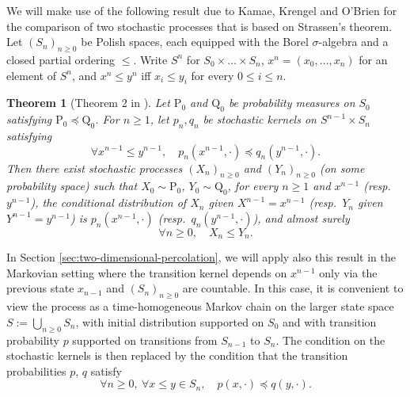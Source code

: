 \documentclass[11pt]{article}
\newtheorem{theorem}{Theorem}
\theoremstyle{remark}
\begin{document}
We will make use of the following result due to Kamae, Krengel and O’Brien
for the comparison of two stochastic processes that is based on Strassen’s theorem. Let $(S_n)_{n\ge 0}$ be Polish spaces, each equipped with the Borel $\sigma$-algebra and a closed partial ordering $\leq$. Write $S^n$ for $S_0 \times \ldots \times S_n$, $x^n = (x_0,\ldots,x_n)$ for an element of $S^n$, and $x^n \le y^n$ iff $x_i \le y_i$ for every $0\le i\le n$.
\begin{theorem}[Theorem 2 in \cite{Kamae1977}] \label{thm:Kamae}
	Let $\mathrm{P}_0$ and $\mathrm{Q}_0$ be probability measures on $S_0$ satisfying $\mathrm{P}_0 \preceq \mathrm{Q}_0$. For $n\ge 1$, let $p_n,q_n$ be stochastic kernels on $S^{n-1}\times S_n$ satisfying
	\begin{equation}
		\forall x^{n-1} \le y^{n-1}, \quad p_n(x^{n-1},\boldsymbol{\cdot}) \preceq q_n(y^{n-1},\boldsymbol{\cdot}).
	\end{equation}
	Then there exist stochastic processes $(X_n)_{n\ge 0}$ and $(Y_n)_{n\ge 0}$ (on some probability space) such that $X_0 \sim \mathrm{P}_0$, $Y_0 \sim \mathrm{Q}_0$, for every $n\ge 1$ and $x^{n-1}$ (resp.\ $y^{n-1}$), the conditional distribution of $X_n$ given $X^{n-1} = x^{n-1}$ (resp.\ $Y_n$ given $Y^{n-1} = y^{n-1}$) is $p_n(x^{n-1},\boldsymbol{\cdot})$ (resp.\ $q_n(y^{n-1},\boldsymbol{\cdot})$), and almost surely
	\begin{equation}
		\forall n \ge 0, \quad X_n \le Y_n.
	\end{equation}
\end{theorem}
In Section \ref{sec:two-dimensional-percolation}, we will apply also this result in the Markovian setting where the transition kernel depends on $x^{n-1}$ only via the previous state $x_{n-1}$ and $(S_n)_{n\ge 0}$ are countable. In this case, it is convenient to view the process as a time-homogeneous Markov chain on the larger state space $S := \bigcup_{n\ge 0} S_n$, with initial distribution supported on $S_0$ and with transition probability $p$ supported on transitions from $S_{n-1}$ to $S_n$. The condition on the stochastic kernels is then replaced by the condition that the transition probabilities $p$, $q$ satisfy
\begin{equation}
	\forall n \ge 0,\ \forall x \le y \in S_n, \quad p(x,\boldsymbol{\cdot}) \preceq q(y,\boldsymbol{\cdot}).
\end{equation}
\end{document}
